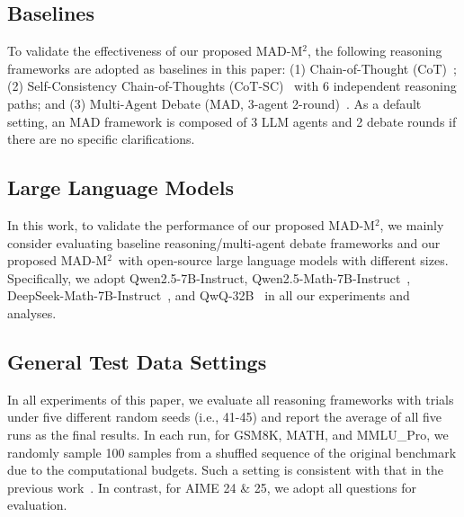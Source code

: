 \documentclass{article} %
\newcommand{\methodname}{MAD-M$^2$}
\theoremstyle{plain}
\begin{document}
\vspace{-8pt}
\subsection{Baselines} 
\vspace{-4pt}
To validate the effectiveness of our proposed \methodname, the following reasoning frameworks are adopted as baselines in this paper: (1) Chain-of-Thought (CoT)~\citep{cot}; (2) Self-Consistency Chain-of-Thoughts (CoT-SC)~\citep{cot_sc} with 6 independent reasoning paths; and (3) Multi-Agent Debate (MAD, 3-agent 2-round)~\citep{mad_yilun}. As a default setting, an MAD framework is composed of 3 LLM agents and 2 debate rounds if there are no specific clarifications.

\vspace{-8pt}
\subsection{Large Language Models} 
\vspace{-4pt}
In this work, to validate the performance of our proposed \methodname, we mainly consider evaluating baseline reasoning/multi-agent debate frameworks and our proposed \methodname\ with open-source large language models with different sizes. Specifically, we adopt Qwen2.5-7B-Instruct, Qwen2.5-Math-7B-Instruct~\citep{qwen2.5,qwen25math}, DeepSeek-Math-7B-Instruct~\citep{shao2024deepseekmath}, and QwQ-32B~\citep{qwq32b} in all our experiments and analyses. %

\vspace{-8pt}
\subsection{General Test Data Settings}
\vspace{-4pt}
In all experiments of this paper, we evaluate all reasoning frameworks with trials under five different random seeds (i.e., 41-45) and report the average of all five runs as the final results. In each run, for GSM8K, MATH, and MMLU\_Pro, we randomly sample 100 samples from a shuffled sequence of the original benchmark due to the computational budgets. Such a setting is consistent with that in the previous work~\citep{mad_yilun}. In contrast, for AIME 24 \& 25, we adopt all questions for evaluation.

\vspace{-8pt}
\end{document}
